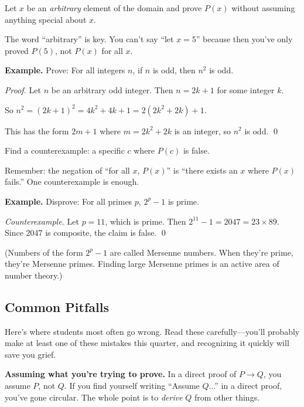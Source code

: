 \begin{strategy}
Let $x$ be an \emph{arbitrary} element of the domain and prove $P(x)$ without assuming anything special about $x$.

The word ``arbitrary'' is key. You can't say ``let $x = 5$'' because then you've only proved $P(5)$, not $P(x)$ for all $x$.

\textbf{Example.} Prove: For all integers $n$, if $n$ is odd, then $n^2$ is odd.

\emph{Proof.} Let $n$ be an arbitrary odd integer. Then $n = 2k + 1$ for some integer $k$.

So $n^2 = (2k+1)^2 = 4k^2 + 4k + 1 = 2(2k^2 + 2k) + 1$.

This has the form $2m + 1$ where $m = 2k^2 + 2k$ is an integer, so $n^2$ is odd. \qed
\end{strategy}

\begin{strategy}
Find a counterexample: a specific $c$ where $P(c)$ is false.

Remember: the negation of ``for all $x$, $P(x)$'' is ``there exists an $x$ where $P(x)$ fails.'' One counterexample is enough.

\textbf{Example.} Disprove: For all primes $p$, $2^p - 1$ is prime.

\emph{Counterexample.} Let $p = 11$, which is prime. Then $2^{11} - 1 = 2047 = 23 \times 89$. Since 2047 is composite, the claim is false. \qed

(Numbers of the form $2^p - 1$ are called Mersenne numbers. When they're prime, they're Mersenne primes. Finding large Mersenne primes is an active area of number theory.)
\end{strategy}

\subsection*{Common Pitfalls}

Here's where students most often go wrong. Read these carefully---you'll probably make at least one of these mistakes this quarter, and recognizing it quickly will save you grief.

\begin{commonmistake}
\textbf{Assuming what you're trying to prove.} In a direct proof of $P \to Q$, you assume $P$, not $Q$. If you find yourself writing ``Assume $Q$...'' in a direct proof, you've gone circular. The whole point is to \emph{derive} $Q$ from other things.
\end{commonmistake}

